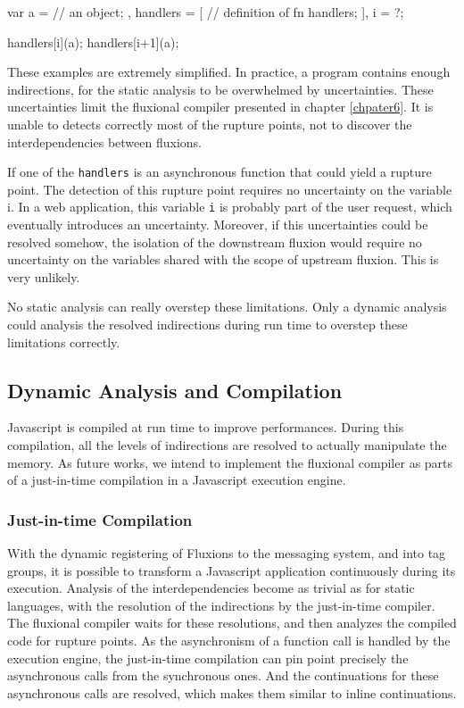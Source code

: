 \begin{code}[js,
  caption={Two levels of indirection},
  label={lst:indirections}]
var a = {
      // an object;
    },
    handlers = [
      // definition of fn handlers;
    ],
    i = ?;

handlers[i](a);
handlers[i+1](a);
\end{code}

These examples are extremely simplified.
In practice, a program contains enough indirections, for the static analysis to be overwhelmed by uncertainties.
These uncertainties limit the fluxional compiler presented in chapter \ref{chpater6}.
It is unable to detects correctly most of the rupture points, not to discover the interdependencies between fluxions.

If one of the \texttt{handlers} is an asynchronous function that could yield a rupture point.
The detection of this rupture point requires no uncertainty on the variable i.
In a web application, this variable \texttt{i} is probably part of the user request, which eventually introduces an uncertainty.
Moreover, if this uncertainties could be resolved somehow, the isolation of the downstream fluxion would require no uncertainty on the variables shared with the scope of upstream fluxion.
This is very unlikely.

No static analysis can really overstep these limitations.
Only a dynamic analysis could analysis the resolved indirections during run time to overstep these limitations correctly.

\subsection{Dynamic Analysis and Compilation}

Javascript is compiled at run time to improve performances.
During this compilation, all the levels of indirections are resolved to actually manipulate the memory.
As future works, we intend to implement the fluxional compiler as parts of a just-in-time compilation in a Javascript execution engine.

\subsubsection{Just-in-time Compilation}

With the dynamic registering of Fluxions to the messaging system, and into tag groups, it is possible to transform a Javascript application continuously during its execution.
Analysis of the interdependencies become as trivial as for static languages, with the resolution of the indirections by the just-in-time compiler.
The fluxional compiler waits for these resolutions, and then analyzes the compiled code for rupture points.
As the asynchronism of a function call is handled by the execution engine, the just-in-time compilation can pin point precisely the asynchronous calls from the synchronous ones. 
And the continuations for these asynchronous calls are resolved, which makes them similar to inline continuations.

